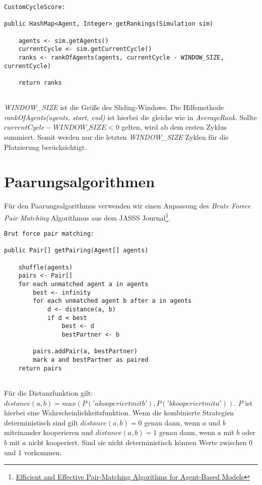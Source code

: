 \begin{lstlisting}
CustomCycleScore:

public HashMap<Agent, Integer> getRankings(Simulation sim) 
	
	agents <- sim.getAgents()
	currentCycle <- sim.getCurrentCycle()
	ranks <- rankOfAgents(agents, currentCycle - WINDOW_SIZE, currentCycle)
	
	return ranks
	
\end{lstlisting}
\emph{WINDOW\_SIZE} ist die Größe des Sliding-Windows. Die Hilfsmethode \emph{rankOfAgents(agents, start, end)} ist hierbei die gleiche wie in \emph{AverageRank}. Sollte $currentCycle - WINDOW\_SIZE < 0$ gelten, wird ab dem ersten Zyklus summiert. Somit werden nur die letzten \emph{WINDOW\_SIZE} Zyklen für die Platzierung berücksichtigt. 


\section{Paarungsalgorithmen}

Für den Paarungsalgorithmus verwenden wir einen Anpassung des \emph{Brute Forece Pair Matching} Algorithmus aus dem JASSS Journal\footnote{\href{http://jasss.soc.surrey.ac.uk/20/4/8.html}{Efficient and Effective Pair-Matching Algorithms for Agent-Based Models}}. 

\begin{lstlisting}
Brut force pair matching:

public Pair[] getPairing(Agent[] agents) 

	shuffle(agents)
	pairs <- Pair[]
	for each unmatched agent a in agents
		best <- infinity
		for each unmatched agent b after a in agents
			d <- distance(a, b)
			if d < best
				best <- d
				bestPartner <- b
				
		pairs.addPair(a, bestPartner)
		mark a and bestPartner as paired		
	return pairs	
	
\end{lstlisting}
Für die Distanzfunktion gilt: $distance(a, b) = max(P('a kooperiert mit b'), P('b kooperiert mit a'))$. $P$ ist hierbei eine Wahrscheinlichkeitsfunktion. Wenn die kombinierte Strategien deterministisch sind gilt $distance(a, b) = 0$ genau dann, wenn $a$ und $b$ miteinander kooperieren und $distance(a, b) = 1$ genau dann, wenn $a$ mit $b$ oder $b$ mit $a$ nicht kooperiert. Sind sie nicht deterministisch können Werte zwischen 0 und 1 vorkommen.

